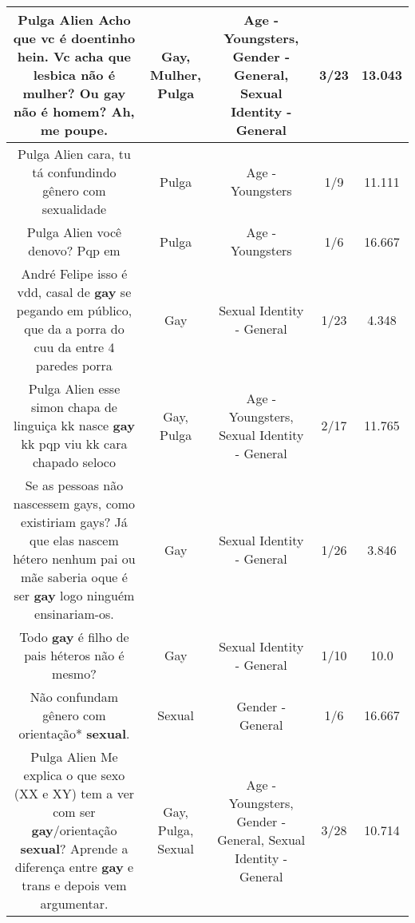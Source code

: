 \documentclass[11pt]{article}
\newlength\mylength
\begin{document}
\begin{center}
\begin{longtable}{|C{.65\mylength}|C{.30\mylength}|C{.12\mylength}|C{.12\mylength}|C{.12\mylength}|}
  \small Pulga Alien Acho que vc é doentinho hein. Vc acha que lesbica não é \textbf{mulher}? Ou \textbf{gay} não é homem? Ah, me poupe.\normalsize   & Gay, Mulher, Pulga & Age - Youngsters, Gender - General, Sexual Identity - General & 3/23 & 13.043 \\  \hline
  \small Pulga Alien cara, tu tá confundindo gênero com sexualidade\normalsize   & Pulga & Age - Youngsters & 1/9 & 11.111 \\  \hline
  \small Pulga Alien você denovo? Pqp em\normalsize   & Pulga & Age - Youngsters & 1/6 & 16.667 \\  \hline
  \small André Felipe isso é vdd, casal de \textbf{gay} se pegando em público, que da a porra do cuu da entre 4 paredes porra\normalsize   & Gay & Sexual Identity - General & 1/23 & 4.348 \\  \hline
  \small Pulga Alien esse simon chapa de linguiça kk nasce \textbf{gay} kk pqp viu kk cara chapado seloco\normalsize   & Gay, Pulga & Age - Youngsters, Sexual Identity - General & 2/17 & 11.765 \\  \hline
  \small Se as pessoas não nascessem gays, como existiriam gays? Já que elas nascem hétero nenhum pai ou mãe saberia oque é ser \textbf{gay} logo ninguém ensinariam-os.\normalsize   & Gay & Sexual Identity - General & 1/26 & 3.846 \\  \hline
  \small Todo \textbf{gay} é filho de pais héteros não é mesmo?\normalsize   & Gay & Sexual Identity - General & 1/10 & 10.0 \\  \hline
  \small Não confundam gênero com orientação* \textbf{sexual}.\normalsize   & Sexual & Gender - General & 1/6 & 16.667 \\  \hline
  \small Pulga Alien Me explica o que sexo (XX e XY) tem a ver com ser \textbf{gay}/orientação \textbf{sexual}? Aprende a diferença entre \textbf{gay} e trans e depois vem argumentar.\normalsize   & Gay, Pulga, Sexual & Age - Youngsters, Gender - General, Sexual Identity - General & 3/28 & 10.714 \\  \hline

\end{longtable}
\end{center}
\end{document}
